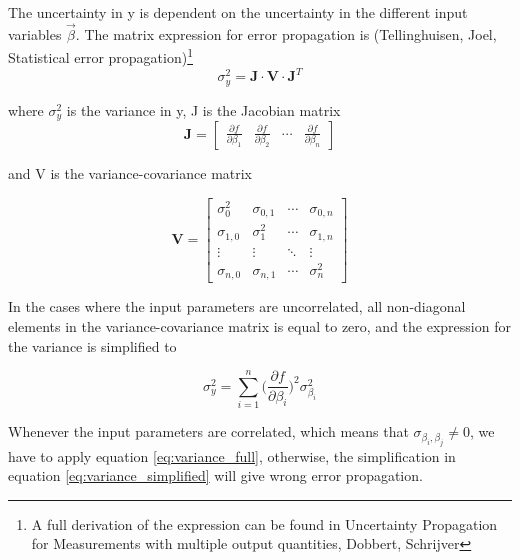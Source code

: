 \noindent The uncertainty in y is dependent on the uncertainty in the different input variables $ \vec{\beta}$. The matrix expression for error propagation is (Tellinghuisen, Joel, Statistical error propagation)\footnote{A full derivation of the expression can be found in Uncertainty Propagation for Measurements with multiple output quantities, Dobbert, Schrijver}
\begin{equation} \label{eq:variance_full}
    \sigma^2_y = \mathbf{J}\cdot \mathbf{V}\cdot \mathbf{J}^T 
\end{equation} 

\noindent where $\sigma^2_y$ is the variance in y, J is the Jacobian matrix
\begin{equation}
\mathbf{J} = 
    \begin{bmatrix}
       \frac{\partial f}{\partial \beta_1} &  \frac{\partial f}{\partial \beta_2} & \cdots & \frac{ \partial f}{\partial \beta_n}
    \end{bmatrix}
\end{equation}

\noindent and V is the variance-covariance matrix 

\begin{equation}
\mathbf{V} = 
\begin{bmatrix}
  \sigma_0^2 & \sigma_{0,1} & \cdots & \sigma_{0,n} \\
  \sigma_{1,0} & \sigma_{1}^2 & \cdots & \sigma_{1,n} \\
  \vdots  & \vdots  & \ddots & \vdots  \\
  \sigma_{n,0} & \sigma_{n,1} & \cdots & \sigma_{n}^2
 \end{bmatrix}
\end{equation}


\noindent In the cases where the input parameters are uncorrelated, all non-diagonal elements in the variance-covariance matrix is equal to zero, and the expression for the variance is simplified to 

\begin{equation} \label{eq:variance_simplified}
    \sigma_y^2 = \sum_{i=1}^n \Big(\frac{\partial f}{\partial \beta_i } \Big)^2 \sigma_{\beta_i}^2
\end{equation}

\noindent Whenever the input parameters are correlated, which means that $\sigma_{\beta_i, \beta_j}\neq 0$, we have to apply equation \ref{eq:variance_full}, otherwise, the simplification in equation \ref{eq:variance_simplified} will give wrong error propagation. \\

